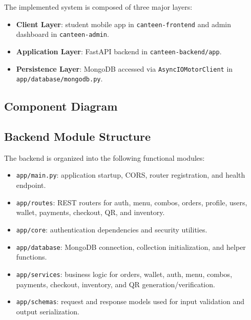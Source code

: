 The implemented system is composed of three major layers:
\begin{itemize}[nosep]
  \item \textbf{Client Layer}: student mobile app in \texttt{canteen-frontend} and admin dashboard in \texttt{canteen-admin}.
  \item \textbf{Application Layer}: FastAPI backend in \texttt{canteen-backend/app}.
  \item \textbf{Persistence Layer}: MongoDB accessed via \texttt{AsyncIOMotorClient} in \texttt{app/database/mongodb.py}.
\end{itemize}

\subsection{Component Diagram}
\begin{center}
\end{center}

\subsection{Backend Module Structure}
The backend is organized into the following functional modules:
\begin{itemize}[nosep]
  \item \texttt{app/main.py}: application startup, CORS, router registration, and health endpoint.
  \item \texttt{app/routes}: REST routers for auth, menu, combos, orders, profile, users, wallet, payments, checkout, QR, and inventory.
  \item \texttt{app/core}: authentication dependencies and security utilities.
  \item \texttt{app/database}: MongoDB connection, collection initialization, and helper functions.
  \item \texttt{app/services}: business logic for orders, wallet, auth, menu, combos, payments, checkout, inventory, and QR generation/verification.
  \item \texttt{app/schemas}: request and response models used for input validation and output serialization.
\end{itemize}

